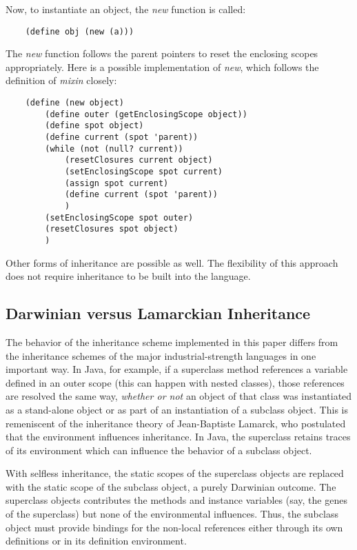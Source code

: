 {{Now, to instantiate an object, the {\it new} function is called:

\begin{verbatim}
    (define obj (new (a)))
\end{verbatim}

The {\it new} function follows the parent pointers to reset the enclosing
scopes appropriately. Here is a possible implementation of {\it new},
which follows the definition of {\it mixin} closely:

\begin{verbatim}
    (define (new object)
        (define outer (getEnclosingScope object))
        (define spot object)
        (define current (spot 'parent))
        (while (not (null? current))
            (resetClosures current object)
            (setEnclosingScope spot current)
            (assign spot current)
            (define current (spot 'parent))
            )
        (setEnclosingScope spot outer)
        (resetClosures spot object)
        )
\end{verbatim}

Other forms of inheritance are possible as well. The flexibility of this
approach does not require inheritance to be built into the language.

\subsection{Darwinian versus Lamarckian Inheritance}

The behavior of the inheritance scheme implemented in this paper differs
from the inheritance schemes of the major industrial-strength languages
in one important way.  In Java, for example, if a superclass method
references a variable defined in an outer scope (this can happen
with nested classes), those references are resolved the same way,
{\it whether or not} an object of that class was instantiated as a
stand-alone object or as part of an instantiation of a subclass object.
This is remeniscent of the inheritance theory of Jean-Baptiste Lamarck,
who postulated that the environment influences inheritance. In Java,
the superclass retains traces of its environment which can influence
the behavior of a subclass object.

With selfless inheritance, the static scopes of the superclass objects
are replaced with the static scope of the subclass object, a purely
Darwinian outcome. The superclass objects contributes the methods
and instance variables (say, the genes of the superclass) but none of
the environmental influences.  Thus, the subclass object must provide
bindings for the non-local references either through its own definitions
or in its definition environment.

}}
